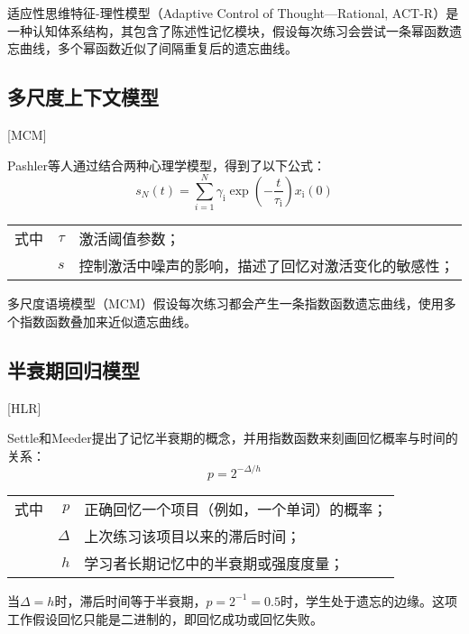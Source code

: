 适应性思维特征-理性模型（Adaptive Control of Thought—Rational, ACT-R）\cite{andersonIntegratedTheoryMind2004}是一种认知体系结构，其包含了陈述性记忆模块，假设每次练习会尝试一条幂函数遗忘曲线，多个幂函数近似了间隔重复后的遗忘曲线。

\subsection{多尺度上下文模型}[MCM]

Pashler等人\cite{pashlerPredictingOptimalSpacing2009}通过结合两种心理学模型，得到了以下公式：
\begin{equation}
    s_{N}(t)=\sum_{i=1}^{N} \gamma_\mathrm{i} \exp \left(-\frac{t}{\tau_\mathrm{i}}\right) x_\mathrm{i}(0)
\end{equation}
\begin{tabularx}{\textwidth}{@{}l@{\quad}r@{———}X@{}}
    式中& $\tau$ &激活阈值参数；\\
    & $s$ &控制激活中噪声的影响，描述了回忆对激活变化的敏感性；
\end{tabularx}\vspace{3.15bp}

多尺度语境模型（MCM）\cite{pashlerPredictingOptimalSpacing2009}假设每次练习都会产生一条指数函数遗忘曲线，使用多个指数函数叠加来近似遗忘曲线。

\subsection{半衰期回归模型}[HLR]\label{sec:HLR}

Settle和Meeder\cite{settlesTrainableSpacedRepetition2016}提出了记忆半衰期的概念，并用指数函数来刻画回忆概率与时间的关系：
\begin{equation}
p = 2^{-\Delta/h}
\end{equation}
\begin{tabularx}{\textwidth}{@{}l@{\quad}r@{———}X@{}}
    式中& $p$ &正确回忆一个项目（例如，一个单词）的概率；\\
    & $\Delta$ &上次练习该项目以来的滞后时间；\\
    & $h$ &学习者长期记忆中的半衰期或强度度量；
\end{tabularx}\vspace{3.15bp}

当$\Delta=h$时，滞后时间等于半衰期，$p=2^{-1}=0.5$时，学生处于遗忘的边缘。这项工作假设回忆只能是二进制的，即回忆成功或回忆失败。

